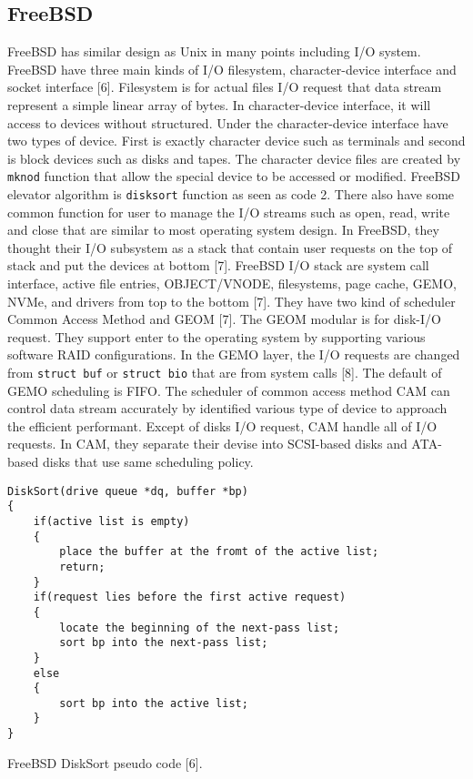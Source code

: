 \documentclass[letterpaper,draftclsnofoot,journal,compsoc,10pt,onecolumn]{IEEEtran}
\begin{document}
\subsection{FreeBSD}
\indent FreeBSD has similar design as Unix in many points including I/O system. FreeBSD have three main kinds of I/O filesystem, character-device interface and socket interface [6]. Filesystem is for actual files I/O request that data stream represent a simple linear array of bytes. In character-device interface, it will access to devices without structured. Under the character-device interface have two types of device. First is exactly character device such as terminals and second is block devices such as disks and tapes. The character device files are created by \texttt{mknod} function that allow the special device to be accessed or modified. FreeBSD elevator algorithm is \texttt{disksort} function as seen as code 2. There also have some common function for user to manage the I/O streams such as open, read, write and close that are similar to most operating system design. In FreeBSD, they thought their I/O subsystem as a stack that contain user requests on the top of stack and put the devices at bottom [7]. FreeBSD I/O stack are system call interface, active file entries, OBJECT/VNODE, filesystems, page cache, GEMO, NVMe, and drivers from top to the bottom [7]. They have two kind of scheduler Common Access Method and GEOM [7]. The GEOM modular is for disk-I/O request. They support enter to the operating system by supporting various software RAID configurations. In the GEMO layer, the I/O requests are changed from \texttt{struct buf} or \texttt{struct bio} that are from system calls [8]. The default of GEMO scheduling is FIFO. The scheduler of common access method CAM can control data stream accurately by identified various type of device to approach the efficient performant. Except of disks I/O request, CAM handle all of I/O requests. In CAM, they separate their devise into SCSI-based disks and ATA-based disks that use same scheduling policy.\\
\begin{lstlisting}[style=CStyle] 
DiskSort(drive queue *dq, buffer *bp)
{
	if(active list is empty)
	{
		place the buffer at the fromt of the active list;
		return;
	}
	if(request lies before the first active request)
	{
		locate the beginning of the next-pass list;
		sort bp into the next-pass list;
	}
	else
	{
		sort bp into the active list;
	}
}

\end{lstlisting}
FreeBSD DiskSort pseudo code [6].
\end{document}
